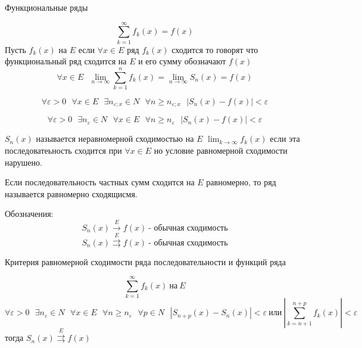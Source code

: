 \begin{title}
  Функциональные ряды
\end{title}

$$
\sum_{k=1}^{\infty} f_k (x) = f(x)
$$
Пусть $f_k(x)$ на $E$ если $\forall x \in E$ ряд $f_k(x)$ сходится то
говорят что функциональный ряд сходится на $E$ и его сумму обозначают $f(x)$
$$
\forall x \in E ~~~ \lim_{n \to \infty} \sum_{k=1}^n f_k(x) =
\lim_{n \to \infty} S_n(x) = f(x)
$$

\begin{define}
  $$
  \forall \varepsilon > 0 ~~~ \forall x \in E ~~~ \exists n_{\varepsilon; x}
  \in N ~~~ \forall n \ge n_{\varepsilon; x} ~~~ \left| S_n(x) - f(x) \right|
  < \varepsilon
  $$
\end{define}

\begin{define}
  $$
  \forall \varepsilon > 0 ~~~ \exists n_{\varepsilon} \in N ~~~ \forall x \in E
  ~~~ \forall n \ge n_{\varepsilon} ~~~ |S_n (x) - f(x)| < \varepsilon
  $$
\end{define}

$S_n(x)$ называется неравномерной сходимостью на $E$
$\lim_{k \to \infty} f_k(x)$ если эта последоватеьность сходится при
$\forall x \in E$ но условие равномерной сходимости нарушено.

\begin{define}
  Если последовательность частных сумм сходится на $E$ равномерно, то ряд
  называется равномерно сходящисмя.

  Обозначения:
  $$
  S_n(x) \stackrel{E}{\to} f(x) ~ \text{- обычная сходимость}
  $$
  $$
  S_n(x) \stackrel{E}{\rightrightarrows} f(x) ~ \text{- обычная сходимость}
  $$
\end{define}

\begin{title}
  Критерия равномерной сходимости ряда последовательности и функций ряда
\end{title}

\begin{block}
  $$
  \sum_{k=1}^{\infty} f_k(x) ~ \text{на} ~ E
  $$
  $$
  \forall \varepsilon > 0 ~~~ \exists n_{\varepsilon} \in N ~~~
  \forall x \in E ~~~ \forall n \ge n_{\varepsilon} ~~~ \forall p \in N ~~~
  |S_{n+p}(x) - S_n(x)| < \varepsilon ~ \text{или} ~
  \left| \sum_{k = n + 1}^{n+p} f_k(x) \right| < \varepsilon
  $$
  тогда $S_n(x) \stackrel{E}{\rightrightarrows} f(x)$
\end{block}

